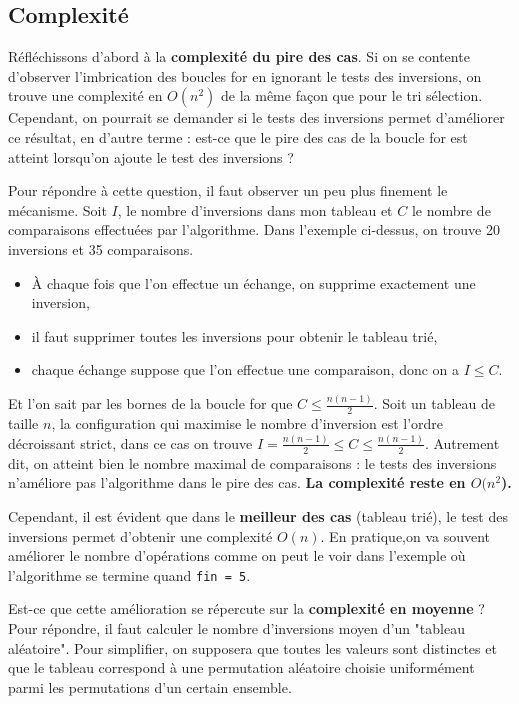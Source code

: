 \documentclass{../cours}
\begin{document}
\subsection{Complexité}

Réfléchissons d'abord à la \textbf{complexité du pire des cas}. Si on se contente d'observer l'imbrication des boucles for en ignorant le tests des inversions, on trouve une complexité en $O(n^2)$ de la même façon que pour le tri sélection. Cependant, on pourrait se demander si le tests des inversions permet d'améliorer ce résultat, en d'autre terme : est-ce que le pire des cas de la boucle for est atteint lorsqu'on ajoute le test des inversions ? 

Pour répondre à cette question, il faut observer un peu plus finement le mécanisme. Soit $I$, le nombre d'inversions dans mon tableau et $C$ le nombre de comparaisons effectuées par l'algorithme. Dans l'exemple ci-dessus, on trouve 20 inversions et 35 comparaisons.
\begin{itemize}
\item \`A chaque fois que l'on effectue un échange, on supprime exactement une inversion,
\item il faut supprimer toutes les inversions pour obtenir le tableau trié,
\item chaque échange suppose que l'on effectue une comparaison, donc on a $I \leq C$. 
\end{itemize}
Et l'on sait par les bornes de la boucle for que $C \leq \frac{n(n-1)}{2}$. Soit un tableau de taille $n$, la configuration qui maximise le nombre d'inversion est l'ordre décroissant strict, dans ce cas on trouve $I = \frac{n(n-1)}{2} \leq C \leq \frac{n(n-1)}{2}$. Autrement dit, on atteint bien le nombre maximal de comparaisons : le tests des inversions n'améliore pas l'algorithme dans le pire des cas. \textbf{La complexité reste en $O(n^2$).}

Cependant, il est évident que dans le \textbf{meilleur des cas} (tableau trié), le test des inversions permet d'obtenir une complexité $O(n)$. En pratique,on va souvent améliorer le nombre d'opérations comme on peut le voir dans l'exemple où l'algorithme se termine quand {\tt fin = 5}. 

Est-ce que cette amélioration se répercute sur la \textbf{complexité en moyenne} ? Pour répondre, il faut calculer le nombre d'inversions moyen d'un "tableau aléatoire". Pour simplifier, on supposera que toutes les valeurs sont distinctes et que le tableau correspond à une permutation aléatoire choisie uniformément parmi les permutations d'un certain ensemble.
\end{document}
